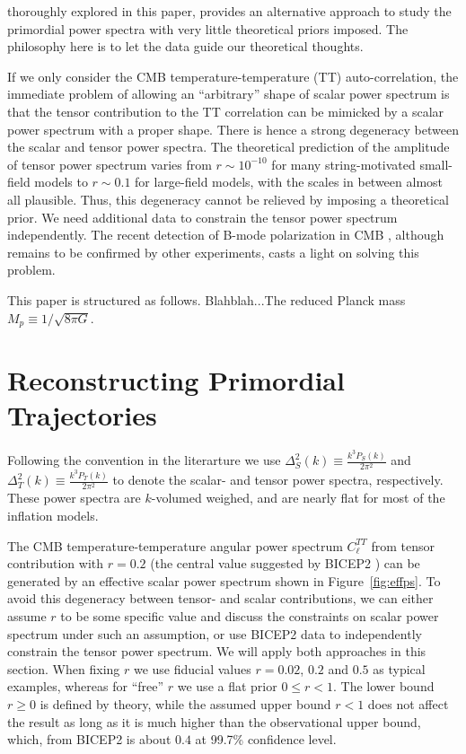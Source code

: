 \documentclass[11pt]{article}
\begin{document}
thoroughly explored in this paper, provides an alternative approach to study the primordial power spectra with very little theoretical priors imposed. The philosophy here is to let the data guide our theoretical thoughts.

If we only consider the CMB temperature-temperature (TT) auto-correlation, the immediate problem of allowing an ``arbitrary'' shape of scalar power spectrum is that the tensor contribution to the TT correlation can be mimicked by a scalar power spectrum with a proper shape. There is hence a strong degeneracy between the scalar and tensor power spectra. The theoretical prediction of the amplitude of tensor power spectrum varies from $r\sim 10^{-10}$ for many string-motivated small-field models to  $r\sim 0.1$ for large-field models, with the scales in between almost all plausible. Thus, this degeneracy cannot be relieved by imposing a theoretical prior. We need additional data to constrain the tensor power spectrum independently. The recent detection of B-mode polarization in CMB \cite{BICEP2}, although remains to be confirmed by other experiments, casts a light on solving this problem.

This paper is structured as follows. Blahblah...The reduced Planck mass $M_p\equiv 1/\sqrt{8\pi G}$. 

\section{Reconstructing Primordial Trajectories}

Following the convention in the literarture we use $\Delta^2_{S}(k) \equiv \frac{k^3P_S(k)}{2\pi^2}$ and $\Delta^2_T(k) \equiv \frac{k^3P_T(k)}{2\pi^2}$ to denote the scalar- and tensor power spectra, respectively. These power spectra are $k$-volumed weighed, and are nearly flat for most of the inflation models.

The CMB temperature-temperature angular power spectrum $C_\ell^{TT}$ from tensor contribution with $r=0.2$ (the central value suggested by BICEP2 \cite{BICEP2}) can be generated by an effective scalar power spectrum shown in Figure~\ref{fig:effps}. To avoid this degeneracy between tensor- and scalar contributions, we can either assume $r$ to be some specific value and discuss the constraints on scalar power spectrum under such an assumption, or use BICEP2 data to independently constrain the tensor power spectrum. We will apply both approaches in this section. When fixing $r$ we use fiducial values $r=0.02$,  $0.2$ and $0.5$ as typical examples, whereas for ``free'' $r$ we use a flat prior $0\le r < 1$. The lower bound $r\ge 0$ is defined by theory, while the assumed upper bound $r<1$ does not affect the result as long as it is much higher than the observational upper bound, which, from BICEP2 is about $0.4$ at 99.7\% confidence level.   
\end{document}

